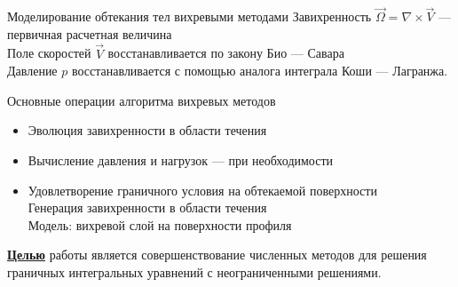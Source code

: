 \documentclass[ignoreonframetext,unicode]{beamer}
\begin{document}
\begin{frame}{Моделирование обтекания тел вихревыми методами}
	Завихренность $\vec \Omega=\nabla\times\vec V$ --- первичная расчетная величина\\
	Поле скоростей $\vec V$ восстанавливается по закону Био --- Савара\\
	Давление $p$ восстанавливается с помощью аналога интеграла Коши --- Лагранжа.\vspace*{-1.5mm}
	\begin{block}{Основные операции алгоритма вихревых методов}
		\begin{itemize}
			\item Эволюция завихренности в области течения
			\item Вычисление давления и нагрузок --- при необходимости
			\item Удовлетворение граничного условия на обтекаемой поверхности\\
				  Генерация завихренности в области течения\\
				  Модель: вихревой слой на поверхности профиля
		\end{itemize}
	\end{block}\vspace*{-2.5mm}
\begin{block}{}
	\underline{\textbf{Целью}} работы является совершенствование численных методов для решения граничных интегральных уравнений с неограниченными решениями.
\end{block}	
\end{frame}
\end{document}
